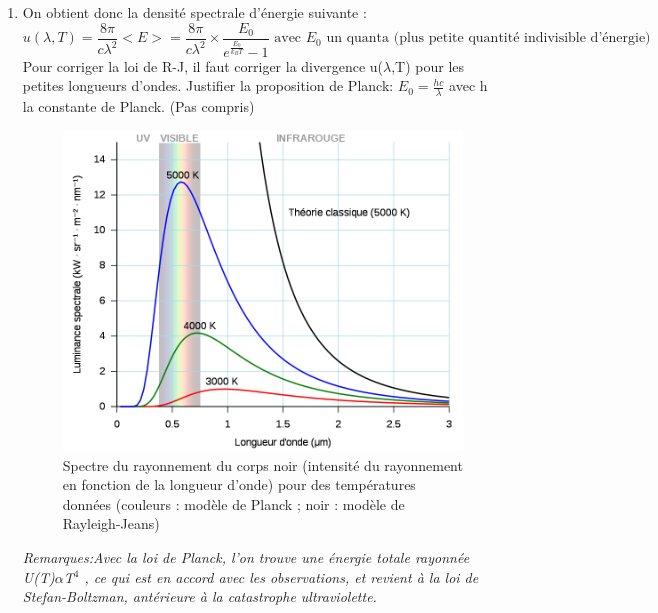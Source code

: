 \documentclass{article}
\begin{document}
\begin{enumerate}
    \item On obtient donc la densité spectrale d'énergie suivante :
    \[ u(\lambda,T) = \frac{8\pi}{c\lambda^{2}}<E> = \frac{8\pi}{c\lambda^{2}} \times \frac{E_{0}}{e^{\frac{E_{0}}{k_{B}T}}-1} \text{ avec $E_{0}$ un quanta (plus petite quantité indivisible d'énergie)} \] 
    Pour corriger la loi de R-J, il faut corriger la divergence u($\lambda$,T) pour les petites longueurs d'ondes.\newline
    Justifier la proposition de Planck: $E_{0} = \frac{hc}{\lambda}$ avec h la constante de Planck.\newline
    (Pas compris)
    \begin{figure}[h]
        \centering
        \includegraphics[scale=0.3]{catastrophe_ultraviolette.png}
        \caption{Spectre du rayonnement du corps noir (intensité du rayonnement en fonction de la longueur d'onde) pour des températures données (couleurs : modèle de Planck ; noir : modèle de Rayleigh-Jeans)}
    \end{figure}

    \indent\textit{Remarques:}\textit{Avec la loi de Planck, l'on trouve une énergie totale rayonnée U(T)$\alpha$T$^{4}$ , ce qui est en accord avec les observations, et revient à la loi de Stefan-Boltzman, antérieure à la catastrophe ultraviolette.}
\end{enumerate}
\end{document}
